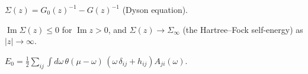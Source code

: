 \begin{definition}\label{def:self-energy}
  $\Sigma(z) = G_0(z)^{-1} - G(z)^{-1}$ (Dyson equation).
\end{definition}

\begin{theorem}\label{thm:herglotz}
  $\operatorname{Im}\Sigma(z)\le 0$ for $\operatorname{Im}z>0$, and $\Sigma(z)\to\Sigma_\infty$ (the Hartree–Fock self-energy)
  as $|z|\to\infty$.
\end{theorem}

\begin{theorem}\label{thm:galitskii-migdal}
  $E_0 = \tfrac12\sum_{ij}\int\! d\omega\,\theta(\mu-\omega)\,(\omega\,\delta_{ij}+h_{ij})A_{ji}(\omega)$.
\end{theorem}
